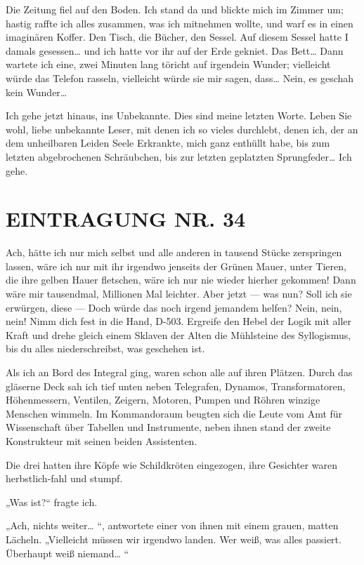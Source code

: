 Die Zeitung fiel auf den Boden. Ich stand da und blickte mich im
Zimmer um; hastig raffte ich alles zusammen, was ich mitnehmen
wollte, und warf es in einen imaginären Koffer. Den Tisch, die
Bücher, den Sessel. Auf diesem Sessel hatte I damals gesessen\ldots{}
und ich hatte vor ihr auf der Erde gekniet. Das Bett\ldots{} Dann
wartete ich eine, zwei Minuten lang töricht auf irgendein Wunder;
vielleicht würde das Telefon rasseln, vielleicht würde sie mir
sagen, dass\ldots{} Nein, es geschah kein Wunder\ldots{}

Ich gehe jetzt hinaus, ins Unbekannte. Dies sind meine letzten
Worte. Leben Sie wohl, liebe unbekannte Leser, mit denen ich so
vieles durchlebt, denen ich, der an dem unheilbaren Leiden Seele
Erkrankte, mich ganz enthüllt habe, bis zum letzten abgebrochenen
Schräubchen, bis zur letzten geplatzten Sprungfeder\ldots{} Ich gehe.

\section{EINTRAGUNG NR. 34}

Ach, hätte ich nur mich selbst und alle anderen in tausend Stücke
zerspringen lassen, wäre ich nur mit ihr irgendwo jenseits der
Grünen Mauer, unter Tieren, die ihre gelben Hauer fletschen, wäre
ich nur nie wieder hierher gekommen! Dann wäre mir tausendmal,
Millionen Mal leichter. Aber jetzt — was nun? Soll ich sie
erwürgen, diese — Doch würde das noch irgend jemandem helfen? Nein,
nein, nein! Nimm dich fest in die Hand, D-503. Ergreife den Hebel
der Logik mit aller Kraft und drehe gleich einem Sklaven der Alten
die Mühlsteine des Syllogismus, bis du alles niederschreibst, was
geschehen ist.

Als ich an Bord des Integral ging, waren schon alle auf ihren
Plätzen. Durch das gläserne Deck sah ich tief unten neben
Telegrafen, Dynamos, Transformatoren, Höhenmessern, Ventilen,
Zeigern, Motoren, Pumpen und Röhren winzige Menschen wimmeln. Im
Kommandoraum beugten sich die Leute vom Amt für Wissenschaft über
Tabellen und Instrumente, neben ihnen stand der zweite Konstrukteur
mit seinen beiden Assistenten.

Die drei hatten ihre Köpfe wie Schildkröten eingezogen, ihre
Gesichter waren herbstlich-fahl und stumpf.

„Was ist?“ fragte ich.

„Ach, nichts weiter\ldots{} “, antwortete einer von ihnen mit einem
grauen, matten Lächeln. „Vielleicht müssen wir irgendwo landen. Wer
weiß, was alles passiert. Überhaupt weiß niemand\ldots{} “

